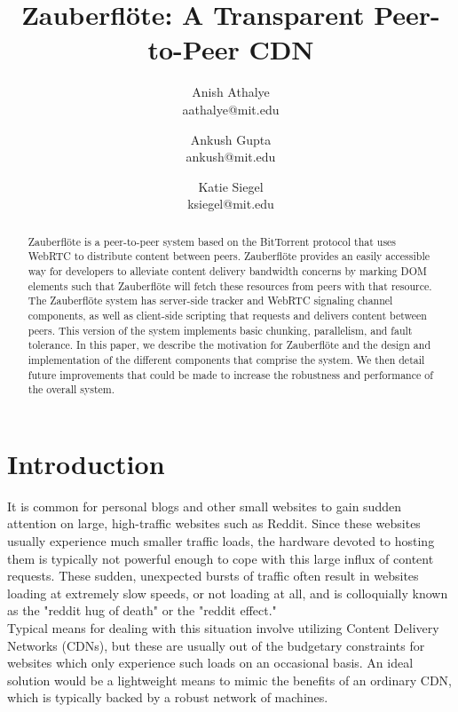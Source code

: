 \documentclass[letterpaper,twocolumn,10pt]{article}
\newcommand{\zbf}{Zauberfl\"{o}te\xspace}
\newcommand{\projtitle}{\zbf: A Transparent Peer-to-Peer CDN}
\begin{document}
\title{\Large \bf \projtitle}

\author{
    {\rm Anish Athalye}\\
    aathalye@mit.edu
    \and
    {\rm Ankush Gupta}\\
    ankush@mit.edu
    \and
    {\rm Katie Siegel}\\
    ksiegel@mit.edu
}

\maketitle
\thispagestyle{empty}

\begin{abstract}
\zbf is a peer-to-peer system based on the BitTorrent protocol that uses WebRTC
to distribute content between peers. \zbf provides an easily accessible way for
developers to alleviate content delivery bandwidth concerns by marking DOM elements
such that \zbf will fetch these resources from peers with that resource. The \zbf
system has server-side tracker and WebRTC signaling channel components, as well
as client-side scripting that requests and delivers content between peers.
This version of the system implements basic chunking, parallelism, and fault tolerance.
In this paper, we describe the motivation for \zbf and the design and implementation of the
different components that comprise the system. We then detail future improvements
that could be made to increase the robustness and performance of the overall system.
\end{abstract}

\section{Introduction}
It is common for personal blogs and other small websites to gain sudden attention
on large, high-traffic websites such as Reddit. Since these websites usually
experience much smaller traffic loads, the hardware devoted to hosting them
is typically not powerful enough to cope with this large influx of content requests.
These sudden, unexpected bursts of traffic often result in websites loading at
extremely slow speeds, or not loading at all, and is colloquially known as the
"reddit hug of death" or the "reddit effect." \\

Typical means for dealing with this situation involve utilizing Content Delivery
Networks (CDNs), but these are usually out of the budgetary constraints for
websites which only experience such loads on an occasional basis. An ideal
solution would be a lightweight means to mimic the benefits of an ordinary
CDN, which is typically backed by a robust network of machines. \\
\end{document}
